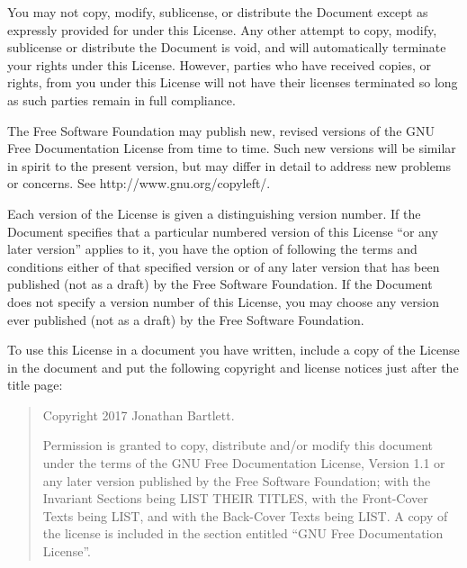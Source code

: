     
    


    

      You may not copy, modify, sublicense, or distribute the Document except as expressly
      provided for under this License. Any other attempt to copy,
      modify, sublicense or distribute the Document is void, and will
      automatically terminate your rights under this License. However,
      parties who have received copies, or rights, from you under this
      License will not have their licenses terminated so long as such
      parties remain in full compliance.
    

    
    


    

      The Free Software
      Foundation may publish new, revised versions of the GNU
      Free Documentation License from time to time. Such new versions
      will be similar in spirit to the present version, but may differ
      in detail to address new problems or concerns. See http://www.gnu.org/copyleft/.
    

    
    

      Each version of the License is given a distinguishing version
      number. If the Document
      specifies that a particular numbered version of this License
      ``or any later version'' applies to it, you have the
      option of following the terms and conditions either of that
      specified version or of any later version that has been
      published (not as a draft) by the Free Software Foundation. If
      the Document does not specify a version number of this License,
      you may choose any version ever published (not as a draft) by
      the Free Software Foundation.
    

    


    

      To use this License in a document you have written, include a copy of
      the License in the document and put the following copyright and
      license notices just after the title page:
    

    
    \begin{quote}
      

	Copyright 2017 Jonathan Bartlett.
      

      

	Permission is granted to copy, distribute and/or modify this
	document under the terms of the GNU Free Documentation
	License, Version 1.1 or any later version published by the
	Free Software Foundation; with the Invariant Sections being LIST
	THEIR TITLES, with the Front-Cover Texts being LIST,
	and with the Back-Cover
	Texts being LIST.  A copy of the license is included in
	the section entitled ``GNU Free Documentation
	License''.
      

    \end{quote}
      
